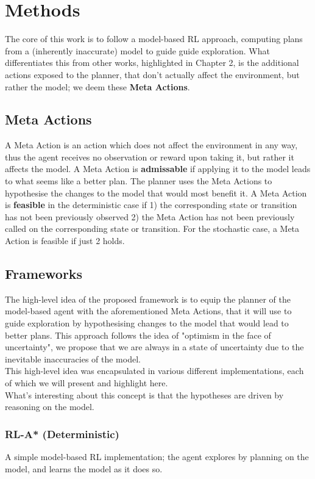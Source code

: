 \chapter{Methods}
\label{chapter4}
The core of this work is to follow a model-based RL approach, computing plans from a (inherently inaccurate) model to guide guide exploration. What differentiates this from other works, highlighted in Chapter 2, is the additional actions exposed to the planner, that don't actually affect the environment, but rather the model; we deem these \textbf{Meta Actions}.

\section{Meta Actions}
A Meta Action is an action which does not affect the environment in any way, thus the agent receives no observation or reward upon taking it, but rather it affects the model. A Meta Action is \textbf{admissable} if applying it to the model leads to what seems like a better plan. The planner uses the Meta Actions to hypothesise the changes to the model that would most benefit it.
A Meta Action is \textbf{feasible} in the deterministic case if 1) the corresponding state or transition has not been previously observed 2) the Meta Action has not been previously called on the corresponding state or transition. For the stochastic case, a Meta Action is feasible if just 2 holds.
\section{Frameworks}
The high-level idea of the proposed framework is to equip the planner of the model-based agent with the aforementioned Meta Actions, that it will use to guide exploration by hypothesising changes to the model that would lead to better plans. This approach follows the idea of "optimism in the face of uncertainty", we propose that we are always in a state of uncertainty due to the inevitable inaccuracies of the model. 
\\This high-level idea was encapsulated in various different implementations, each of which we will present and highlight here.
\\ What's interesting about this concept is that the hypotheses are driven by reasoning on the model.
\subsection{RL-A* (Deterministic)}
A simple model-based RL implementation; the agent explores by planning on the model, and learns the model as it does so.
